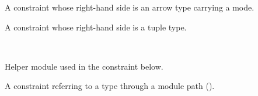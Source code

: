 \medbreak
\label{Oxcaml--type-t_with_arrow_modes}\begin{ocamlindent}A  constraint whose right-hand side is an arrow type carrying a mode.\end{ocamlindent}%
\medbreak
\label{Oxcaml--type-t_with_tuple}\begin{ocamlindent}A  constraint whose right-hand side is a tuple type.\end{ocamlindent}%
\medbreak
\label{Oxcaml--module-M_with}\label{Oxcaml-M_with}\begin{ocamlindent}\label{Oxcaml-M_with--type-t}\\
\end{ocamlindent}%
\begin{ocamlindent}Helper module used in the  constraint below.\end{ocamlindent}%
\medbreak
\label{Oxcaml--type-t_with_dot}\begin{ocamlindent}A  constraint referring to a type through a module path ().\end{ocamlindent}%
\medbreak
\label{Oxcaml--module-type-Arg_with}\label{Oxcaml-module-type-Arg_with}\begin{ocamlindent}\label{Oxcaml-module-type-Arg_with--type-s}\\
\end{ocamlindent}%
